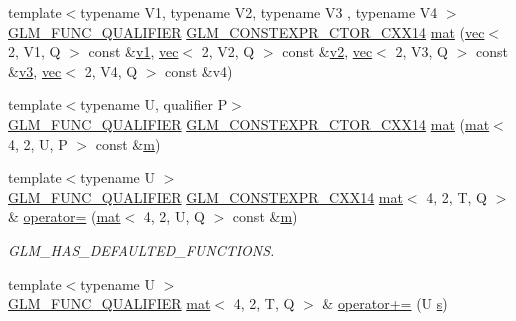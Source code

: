 \begin{DoxyCompactItemize}
{\footnotesize template$<$typename V1, typename V2, typename V3 , typename V4 $>$ }\\\hyperlink{setup_8hpp_a33fdea6f91c5f834105f7415e2a64407}{G\+L\+M\+\_\+\+F\+U\+N\+C\+\_\+\+Q\+U\+A\+L\+I\+F\+I\+ER} \hyperlink{setup_8hpp_a0900f9145e68bf6061b6f5e7be3fa751}{G\+L\+M\+\_\+\+C\+O\+N\+S\+T\+E\+X\+P\+R\+\_\+\+C\+T\+O\+R\+\_\+\+C\+X\+X14} \hyperlink{structglm_1_1mat_3_014_00_012_00_01_t_00_01_q_01_4_ae4f422e3a1f8e3fa42d2782ec06a8200}{mat} (\hyperlink{structglm_1_1vec}{vec}$<$ 2, V1, Q $>$ const \&\hyperlink{_s_d_l__opengl__glext_8h_a435c176a02c061b43e19bdf7c86cceae}{v1}, \hyperlink{structglm_1_1vec}{vec}$<$ 2, V2, Q $>$ const \&\hyperlink{_s_d_l__opengl__glext_8h_a0928f6d0f0f794ba000a21dfae422136}{v2}, \hyperlink{structglm_1_1vec}{vec}$<$ 2, V3, Q $>$ const \&\hyperlink{_s_d_l__opengl__glext_8h_acc806b31cbf466ceba6555983d8b814d}{v3}, \hyperlink{structglm_1_1vec}{vec}$<$ 2, V4, Q $>$ const \&v4)
\item 
{\footnotesize template$<$typename U, qualifier P$>$ }\\\hyperlink{setup_8hpp_a33fdea6f91c5f834105f7415e2a64407}{G\+L\+M\+\_\+\+F\+U\+N\+C\+\_\+\+Q\+U\+A\+L\+I\+F\+I\+ER} \hyperlink{setup_8hpp_a0900f9145e68bf6061b6f5e7be3fa751}{G\+L\+M\+\_\+\+C\+O\+N\+S\+T\+E\+X\+P\+R\+\_\+\+C\+T\+O\+R\+\_\+\+C\+X\+X14} \hyperlink{structglm_1_1mat_3_014_00_012_00_01_t_00_01_q_01_4_aee1461cf7e6bb89dcc9e2d387faef90b}{mat} (\hyperlink{structglm_1_1mat}{mat}$<$ 4, 2, U, P $>$ const \&\hyperlink{_s_d_l__opengl__glext_8h_af593500c283bf1a787a6f947f503a5c2}{m})
\item 
{\footnotesize template$<$typename U $>$ }\\\hyperlink{setup_8hpp_a33fdea6f91c5f834105f7415e2a64407}{G\+L\+M\+\_\+\+F\+U\+N\+C\+\_\+\+Q\+U\+A\+L\+I\+F\+I\+ER} \hyperlink{setup_8hpp_a4dd12abf5e1164bc57f3a34671d03844}{G\+L\+M\+\_\+\+C\+O\+N\+S\+T\+E\+X\+P\+R\+\_\+\+C\+X\+X14} \hyperlink{structglm_1_1mat}{mat}$<$ 4, 2, T, Q $>$ \& \hyperlink{structglm_1_1mat_3_014_00_012_00_01_t_00_01_q_01_4_a5a19a58d4bc0772518b210e63aa86e7f}{operator=} (\hyperlink{structglm_1_1mat}{mat}$<$ 4, 2, U, Q $>$ const \&\hyperlink{_s_d_l__opengl__glext_8h_af593500c283bf1a787a6f947f503a5c2}{m})
\begin{DoxyCompactList}\small\item\em G\+L\+M\+\_\+\+H\+A\+S\+\_\+\+D\+E\+F\+A\+U\+L\+T\+E\+D\+\_\+\+F\+U\+N\+C\+T\+I\+O\+NS. \end{DoxyCompactList}\item 
{\footnotesize template$<$typename U $>$ }\\\hyperlink{setup_8hpp_a33fdea6f91c5f834105f7415e2a64407}{G\+L\+M\+\_\+\+F\+U\+N\+C\+\_\+\+Q\+U\+A\+L\+I\+F\+I\+ER} \hyperlink{structglm_1_1mat}{mat}$<$ 4, 2, T, Q $>$ \& \hyperlink{structglm_1_1mat_3_014_00_012_00_01_t_00_01_q_01_4_adbbf9501dbbf80e25bb46facadfbc924}{operator+=} (U \hyperlink{_s_d_l__opengl_8h_a4af680a6c683f88ed67b76f207f2e6e4}{s})

\end{DoxyCompactItemize}
